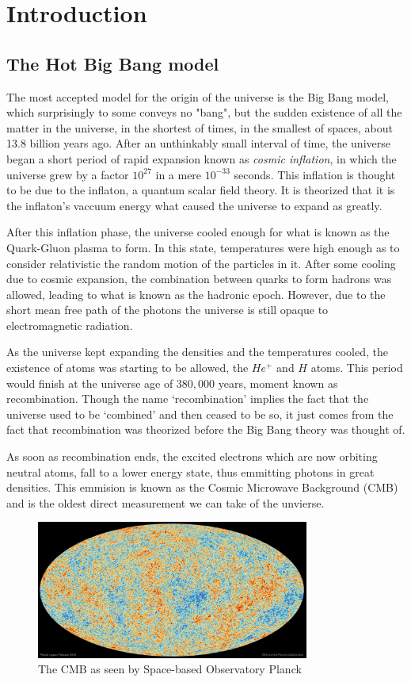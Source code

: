 \chapter{Introduction}

\section{The Hot Big Bang model}

The most accepted model for the origin of the universe is the Big Bang model, which surprisingly to some conveys no "bang", but the sudden existence of all the matter in the universe, in the shortest of times, in the smallest of spaces, about 13.8 billion years ago. After an unthinkably small interval of time, the universe began a short period of rapid expansion known as \textit{cosmic inflation}, in which the universe grew by a factor $10^{27}$ in a mere $10^{-33}$ seconds. This inflation is thought to be due to the inflaton, a quantum scalar field theory. It is theorized that it is the inflaton's vaccuum energy what caused the universe to expand as greatly.

After this inflation phase, the universe cooled enough for what is known as the Quark-Gluon plasma to form. In this state, temperatures were high enough as to consider relativistic the random motion of the particles in it. After some cooling due to cosmic expansion, the combination between quarks to form hadrons was allowed, leading to what is known as the hadronic epoch. However, due to the short mean free path of the photons the universe is still opaque to electromagnetic radiation.

As the universe kept expanding the densities and the temperatures cooled, the existence of atoms was starting to be allowed, the $He^{+}$ and $H$ atoms. This period would finish at the universe age of $380,000$ years, moment known as recombination. Though the name `recombination' implies the fact that the universe used to be `combined' and then ceased to be so, it just comes from the fact that recombination was theorized before the Big Bang theory was thought of.

As soon as recombination ends, the excited electrons which are now orbiting neutral atoms, fall to a lower energy state, thus emmitting photons in great densities. This emmision is known as the Cosmic Microwave Background (CMB) and is the oldest direct measurement we can take of the unvierse.


\begin{figure}[h]
	\centering
	\includegraphics[width=0.8\textwidth]{../figs/cmb.jpeg}
	\caption{The CMB as seen by Space-based Observatory Planck}
	\label{fig:cmb}
\end{figure}
